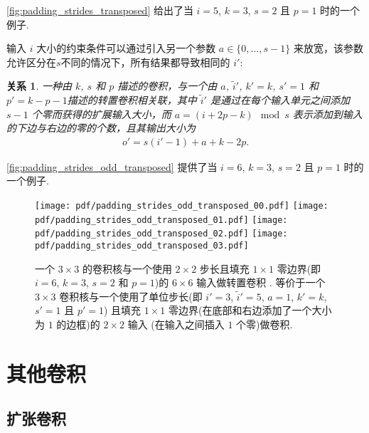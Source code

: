 \documentclass[notitlepage]{ctexrep}
\newtheorem{relationship}{关系}
\begin{document}
\autoref{fig:padding_strides_transposed} 给出了当 $i = 5$, $k =
3$, $s = 2$ 且 $p = 1$ 时的一个例子.

输入 $i$ 大小的约束条件可以通过引入另一个参数 $a \in \{0, \ldots, s - 1\}$ 来放宽，该参数允许区分在$s$不同的情况下，所有结果都导致相同的 $i'$:

\begin{relationship}\label{rel:padding_strides_transposed_odd}
一种由 $k$, $s$ 和 $p$ 描述的卷积，与一个由 $a$, $\tilde{i}'$, $k' = k$, $s' = 1$ 和 $p' = k - p - 1$描述的转置卷积相关联，其中 $\tilde{i}'$ 是通过在每个输入单元之间添加 $s - 1$ 个零而获得的扩展输入大小，而 $a = (i +
2p - k) \mod s$ 表示添加到输入的下边与右边的零的个数，且其输出大小为
\begin{equation*}
\begin{split}
    o' = s (i' - 1) + a + k - 2p.
\end{split}
\end{equation*}
\end{relationship}

\autoref{fig:padding_strides_odd_transposed} 提供了当 $i = 6$, $k
= 3$, $s = 2$ 且 $p = 1$ 时的一个例子.

\begin{figure}[p]
    \centering
    \texttt{[image: pdf/padding\_strides\_odd\_transposed\_00.pdf]}
    \texttt{[image: pdf/padding\_strides\_odd\_transposed\_01.pdf]}
    \texttt{[image: pdf/padding\_strides\_odd\_transposed\_02.pdf]}
    \texttt{[image: pdf/padding\_strides\_odd\_transposed\_03.pdf]}
    \caption{\label{fig:padding_strides_odd_transposed} 
    一个 $3 \times 3$ 的卷积核与一个使用 $2 \times 2$ 步长且填充 $1 \times 1$ 零边界(即 $i = 6$, $k = 3$, $s = 2$ 和 $p = 1$)的 $6 \times 6$ 输入做转置卷积 . 等价于一个 $3 \times 3$ 卷积核与一个使用了单位步长(即 $i' = 3$, $\tilde{i}' = 5$, $a = 1$, $k' = k$, $s' = 1$ 且 $p' = 1$) 且填充 $1 \times 1$ 零边界(在底部和右边添加了一个大小为 $1$ 的边框)的 $2 \times 2$ 输入 (在输入之间插入 $1$ 个零)做卷积.}
\end{figure}

\chapter{其他卷积}

\section{扩张卷积}
\end{document}

